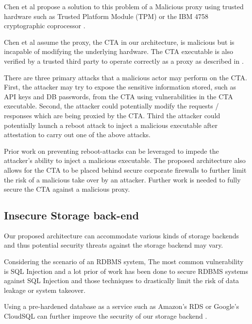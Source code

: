 \documentclass{sig-alternate-05-2015}
\begin{document}
Chen et al \cite{chen_towards_2012} propose a solution to this problem of a Malicious proxy using trusted hardware such as Trusted Platform Module (TPM) or the IBM 4758 cryptographic coprocessor \cite{parno_bootstrapping_2010}. 

Chen et al assume the proxy, the CTA in our architecture, is malicious but is incapable of modifying the underlying hardware. The CTA executable is also verified by a trusted third party to operate correctly as a proxy as described in \cite{parno_bootstrapping_2010}.

There are three primary attacks that a malicious actor may perform on the CTA. First, the attacker may try to expose the sensitive information stored, such as API keys and DB passwords, from the CTA using vulnerabilities in the CTA executable. Second, the attacker could potentially modify the requests / responses which are being proxied by the CTA. Third the attacker could potentially launch a reboot attack to inject a malicious executable after attestation to carry out one of the above attacks.

Prior work \cite{libert_tracing_2008, mccune_flicker:_2008} on preventing reboot-attacks can be leveraged to impede the attacker's ability to inject a malicious executable. The proposed architecture also allows for the CTA to be placed behind secure corporate firewalls to further limit the risk of a malicious take over by an attacker. Further work is needed to fully secure the CTA against a malicious proxy.

\subsection*{Insecure Storage back-end}

Our proposed architecture can accommodate various kinds of storage backends and thus potential security threats against the storage backend may vary. 

Considering the scenario of an RDBMS system, The most common vulnerability is SQL Injection and a lot prior of work has been done to secure RDBMS systems against SQL Injection \cite{halfond_amnesia:_2005, boyd_sqlrand:_2004, halfond_classification_2006} and those techniques to drastically limit the risk of data leakage or system takeover.

Using a pre-hardened database as a service such as Amazon's RDS or Google's CloudSQL can further improve the security of our storage backend \cite{curino_relational_2011} .
\end{document}
